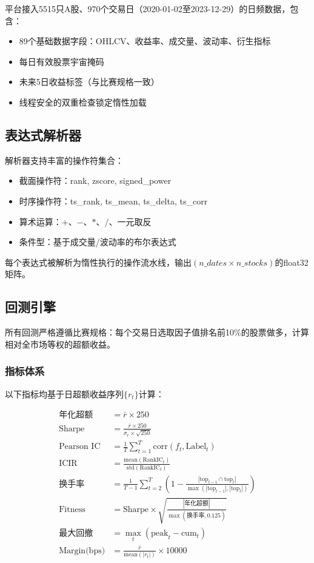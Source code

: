 \documentclass[11pt,a4paper]{ctexart}
\begin{document}
平台接入5515只A股、970个交易日（2020-01-02至2023-12-29）的日频数据，包含：
\begin{itemize}[nosep]
    \item 89个基础数据字段：OHLCV、收益率、成交量、波动率、衍生指标
    \item 每日有效股票宇宙掩码
    \item 未来5日收益标签（与比赛规格一致）
    \item 线程安全的双重检查锁定惰性加载
\end{itemize}

\subsection{表达式解析器}

解析器支持丰富的操作符集合：
\begin{itemize}[nosep]
    \item 截面操作符：rank, zscore, signed\_power
    \item 时序操作符：ts\_rank, ts\_mean, ts\_delta, ts\_corr
    \item 算术运算：$+$、$-$、$*$、$/$、一元取反
    \item 条件型：基于成交量/波动率的布尔表达式
\end{itemize}
每个表达式被解析为惰性执行的操作流水线，输出$(n\_dates \times n\_stocks)$的float32矩阵。

\subsection{回测引擎}

所有回测严格遵循比赛规格：每个交易日选取因子值排名前10\%的股票做多，计算相对全市场等权的超额收益。

\subsubsection{指标体系}

以下指标均基于日超额收益序列$\{r_t\}$计算：

\begin{align}
\text{年化超额} &= \bar{r} \times 250 \\
\text{Sharpe} &= \frac{\bar{r} \times 250}{\sigma_r \times \sqrt{250}} \\
\text{Pearson IC} &= \frac{1}{T}\sum_{t=1}^T \text{corr}(f_t, \text{Label}_t) \\
\text{ICIR} &= \frac{\text{mean}(\text{RankIC}_t)}{\text{std}(\text{RankIC}_t)} \\
\text{换手率} &= \frac{1}{T-1}\sum_{t=2}^T \left(1 - \frac{|\text{top}_{t-1} \cap \text{top}_t|}{\max(|\text{top}_{t-1}|, |\text{top}_t|)}\right) \\
\text{Fitness} &= \text{Sharpe} \times \sqrt{\frac{|\text{年化超额}|}{\max(\text{换手率}, 0.125)}} \\
\text{最大回撤} &= \max_{t} (\text{peak}_t - \text{cum}_t) \\
\text{Margin(bps)} &= \frac{\bar{r}}{\text{mean}(|r_t|)} \times 10000
\end{align}
\end{document}

